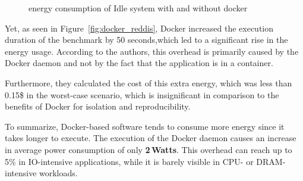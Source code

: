 \begin{figure}
    \caption{energy consumption of Idle system with and without docker \cite{eddie_antonio_santos_how}}\label{fig:docker_idle}
\end{figure}

Yet, as seen in Figure~\ref{fig:docker_reddis}, Docker increased the execution duration of the benchmark by 50 seconds,which led to a significant rise in the energy usage.
According to the authors, this overhead is primarily caused by the Docker daemon and not by the fact that  the application is in a container.


Furthermore, they calculated the cost of this extra energy, which was less than 0.15\$ in the worst-case scenario, which is insignificant in comparison to the benefits of Docker for isolation and reproducibility.

To summarize, Docker-based software tends to consume more energy since it takes longer to execute.
The execution of the Docker daemon causes an increase in average power consumption of only \textbf{2\,Watts}.
This overhead can reach up to 5\% in IO-intensive applications, while it is barely visible in CPU- or DRAM-intensive workloads.



